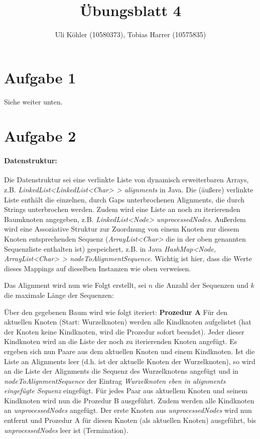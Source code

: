 \documentclass[a4paper,10pt,oneside,reqno]{scrartcl}
\title{Übungsblatt 4}
\author{Uli Köhler (10580373), Tobias Harrer (10575835)}
\begin{document}
\maketitle
\section*{Aufgabe 1}%
Siehe weiter unten.

\section*{Aufgabe 2}%
\paragraph{Datenstruktur:}
Die Datenstruktur sei eine verlinkte Liste von dynamisch erweiterbaren Arrays, z.B. \textit{LinkedList<LinkedList<Char> > alignments} in Java.
Die (äußere) verlinkte Liste enthält die einzelnen, durch Gaps unterbrochenen Alignments, die durch Strings unterbrochen werden. Zudem wird eine Liste an noch zu iterierenden Baumknoten angegeben, z.B. \textit{LinkedList<Node> unprocessedNodes}. Außerdem wird eine Assoziative Struktur zur Zuordnung von einem Knoten zur diesem Knoten entsprechenden Sequenz (\textit{ArrayList<Char>} die in der oben genannten Sequenzliste enthalten ist) gespeichert, z.B. in Java \textit{HashMap<Node, ArrayList<Char> > nodeToAlignmentSequence}. Wichtig ist hier, dass die Werte dieses Mappings auf dieselben Instanzen wie oben verweisen.

Das Alignment wird nun wie Folgt erstellt, sei $n$ die Anzahl der Sequenzen und $k$ die maximale Länge der Sequenzen: 

Über den gegebenen Baum wird wie folgt iteriert:
\textbf{Prozedur A} Für den aktuellen Knoten (Start: Wurzelknoten) werden alle Kindknoten aufgelistet (hat der Knoten keine Kindknoten, wird die Prozedur sofort beendet). Jeder dieser Kindknoten wird an die Liste der noch zu iterierenden Knoten angefügt. Es ergeben sich nun Paare aus dem aktuellen Knoten und einem Kindknoten. Ist die Liste an Alignments leer (d.h. ist der aktuelle Knoten der Wurzelknoten), so wird an die Liste der Alignments die Sequenz des Wurzelknotens angefügt und in \textit{nodeToAlignmentSequence} der Eintrag \textit{Wurzelknoten \textrightarrow eben in alignments eingefügte Sequenz} eingefügt. Für jedes Paar aus aktuellem Knoten und seinem Kindknoten wird nun die Prozedur B ausgeführt. Zudem werden alle Kindknoten an \textit{unprocessedNodes} angefügt. Der erste Knoten aus \textit{unprocessedNodes} wird nun entfernt und Prozedur A für diesen Knoten (als aktuellen Knoten) ausgeführt, bis \textit{unprocessedNodes} leer ist (\textrightarrow Termination).\\[5mm]
\end{document}
